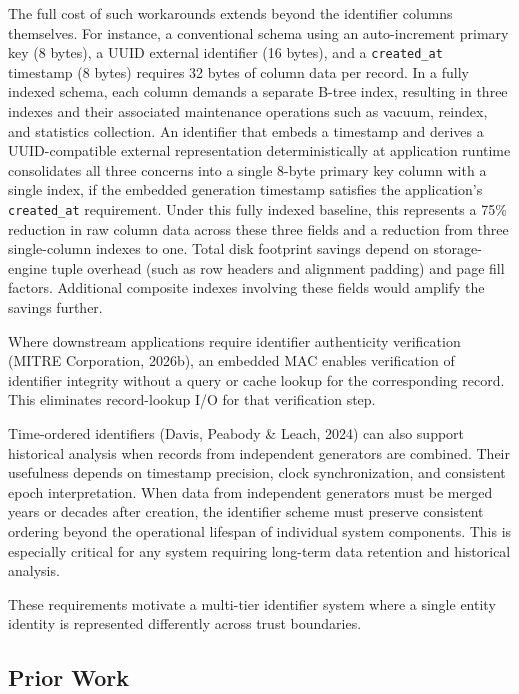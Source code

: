 \documentclass[fleqn,10pt]{wlpeerj}
\begin{document}
The full cost of such workarounds extends beyond the identifier columns
themselves. For instance, a conventional schema using an auto-increment
primary key (8 bytes), a UUID external identifier (16 bytes), and a
\texttt{created\_at} timestamp (8 bytes) requires 32 bytes of column
data per record. In a fully indexed schema, each column demands a
separate B-tree index, resulting in three indexes and their associated
maintenance operations such as vacuum, reindex, and statistics
collection. An identifier that embeds a timestamp and derives a
UUID-compatible external representation deterministically at application
runtime consolidates all three concerns into a single 8-byte primary key
column with a single index, if the embedded generation timestamp
satisfies the application's \texttt{created\_at} requirement. Under this
fully indexed baseline, this represents a 75\% reduction in raw column
data across these three fields and a reduction from three single-column
indexes to one. Total disk footprint savings depend on storage-engine
tuple overhead (such as row headers and alignment padding) and page fill
factors. Additional composite indexes involving these fields would
amplify the savings further.

Where downstream applications require identifier authenticity
verification (MITRE Corporation, 2026b), an embedded MAC enables
verification of identifier integrity without a query or cache lookup for
the corresponding record. This eliminates record-lookup I/O for that
verification step.

Time-ordered identifiers (Davis, Peabody \& Leach, 2024) can also
support historical analysis when records from independent generators are
combined. Their usefulness depends on timestamp precision, clock
synchronization, and consistent epoch interpretation. When data from
independent generators must be merged years or decades after creation,
the identifier scheme must preserve consistent ordering beyond the
operational lifespan of individual system components. This is especially
critical for any system requiring long-term data retention and
historical analysis.

These requirements motivate a multi-tier identifier system where a
single entity identity is represented differently across trust
boundaries.

\subsection{Prior Work}\label{prior-work}
\end{document}

